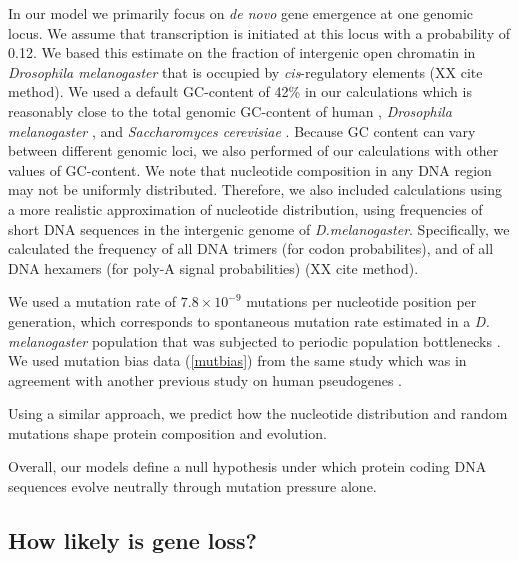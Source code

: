 \documentclass[12pt,a4paper]{article}
\newcommand{\cmnt}[1]{{\color{purple} #1}}
\begin{document}
\cmnt{In our model we primarily focus on \textit{de novo} gene emergence at one genomic locus. We assume that transcription is initiated at this locus with a probability of 0.12. We based this estimate on the fraction of intergenic open chromatin in \textit{Drosophila melanogaster} that is occupied by \textit{cis}-regulatory elements \cite{RedFly2022} (XX cite method)}. We used a default GC-content of 42\% in our calculations which is reasonably close to the total genomic GC-content of human \citep[41\%,][]{Merchant2007}, \textit{Drosophila melanogaster} \citep[41.6\%,][]{flybase}, and \textit{Saccharomyces cerevisiae} \citep[38\%,][]{yeastGC}. Because GC content can vary between different genomic loci, we also performed of our calculations with other values of GC-content. \cmnt{We note that nucleotide composition in any DNA region may not be uniformly distributed. Therefore, we also included calculations using a more realistic approximation of nucleotide distribution, using frequencies of short DNA sequences in the intergenic genome of \textit{D.melanogaster}. Specifically, we calculated the frequency of all DNA trimers (for codon probabilites), and of all DNA hexamers (for poly-A signal probabilities) (XX cite method).} 

We used a mutation rate of $7.8\times10^{-9}$ mutations per nucleotide position per generation, which corresponds to spontaneous mutation rate estimated in a \textit{D. melanogaster} population that was subjected to periodic population bottlenecks \cite[mutation accumulation line,][]{drosophilamutrate}. We used mutation bias data (\autoref{mutbias}) from the same study \citep{drosophilamutrate} which was in agreement with another previous study on human pseudogenes \citep{humanmutrate}.

Using a similar approach, we predict how the nucleotide distribution and random mutations shape protein composition and evolution. 

Overall, our models define a null hypothesis under which protein coding DNA sequences evolve neutrally through mutation pressure alone.

\subsection{How likely is gene loss?}
\end{document}
